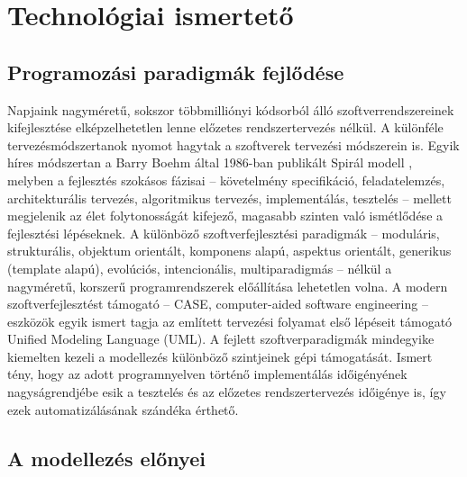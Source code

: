 \chapter{Technológiai ismertető}
\label{chap:techPrim}

\section{Programozási paradigmák fejlődése}

Napjaink nagyméretű, sokszor többmilliónyi kódsorból álló szoftverrendszereinek kifejlesztése elképzelhetetlen lenne előzetes rendszertervezés nélkül.
A különféle tervezésmódszertanok nyomot hagytak a szoftverek tervezési módszerein is.
Egyik híres módszertan a Barry Boehm által 1986-ban publikált Spirál modell \cite{Boehm:1986:SMS:12944.12948}, melyben a fejlesztés szokásos fázisai -- követelmény specifikáció, feladatelemzés, architekturális tervezés, algoritmikus tervezés, implementálás, tesztelés -- mellett megjelenik az élet folytonosságát kifejező, magasabb szinten való ismétlődése a fejlesztési lépéseknek.
A különböző szoftverfejlesztési paradigmák -- moduláris, strukturális, objektum orientált, komponens alapú, aspektus orientált, generikus (template alapú), evolúciós, intencionális, multiparadigmás -- nélkül a nagyméretű, korszerű programrendszerek előállítása lehetetlen volna.
A modern szoftverfejlesztést támogató -- \gls{CASE}, computer-aided software engineering -- eszközök egyik ismert tagja az említett tervezési folyamat első lépéseit támogató Unified Modeling Language (\gls{UML}).
A fejlett szoftverparadigmák mindegyike kiemelten kezeli a modellezés különböző szintjeinek gépi támogatását.
Ismert tény, hogy az adott programnyelven történő implementálás időigényének nagyságrendjébe esik a tesztelés és az előzetes rendszertervezés időigénye is, így ezek automatizálásának szándéka érthető.


\section{A modellezés előnyei}

